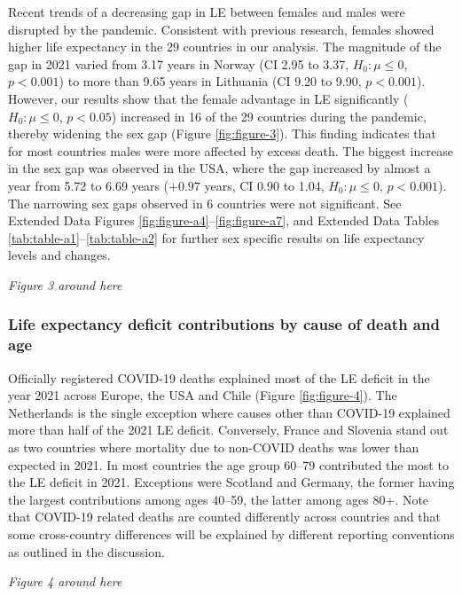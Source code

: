 \documentclass[12pt]{article}
\begin{document}
Recent trends of a decreasing gap in LE between females and males\cite{Zarulli2021} were disrupted by the pandemic. Consistent with previous research, females showed higher life expectancy in the 29 countries in our analysis.
The magnitude of the gap in 2021 varied from 3.17 years in Norway (CI 2.95 to 3.37, $H_0: \mu \leq 0$, $p < 0.001$) to more than 9.65 years in Lithuania (CI 9.20 to 9.90, $p < 0.001$).
However, our results show that the female advantage in LE significantly ($H_0: \mu \leq 0$, $p<0.05$) increased in 16 of the 29 countries during the pandemic, thereby widening the sex gap (Figure \ref{fig:figure-3}).
This finding indicates that for most countries males were more affected by excess death.
The biggest increase in the sex gap was observed in the USA, where the gap increased by almost a year from 5.72 to 6.69 years ($+0.97$ years, CI 0.90 to 1.04, $H_0: \mu \leq 0$, $p < 0.001$).
The narrowing sex gaps observed in 6 countries were not significant. See Extended Data Figures \ref{fig:figure-a4}--\ref{fig:figure-a7}, and Extended Data Tables \ref{tab:table-a1}--\ref{tab:table-a2} for further sex specific results on life expectancy levels and changes.

\par\medskip
\emph{Figure 3 around here}
\par\medskip

\subsubsection*{Life expectancy deficit contributions by cause of death and age}

Officially registered COVID-19 deaths explained most of the LE deficit in the year 2021 across Europe, the USA and Chile (Figure \ref{fig:figure-4}). The Netherlands is the single exception where causes other than COVID-19 explained more than half of the 2021 LE deficit. Conversely, France and Slovenia stand out as two countries where mortality due to non-COVID deaths was lower than expected in 2021. In most countries the age group 60--79 contributed the most to the LE deficit in 2021. Exceptions were Scotland and Germany, the former having the largest contributions among ages 40--59, the latter among ages 80+. Note that COVID-19 related deaths are counted differently across countries and that some cross-country differences will be explained by different reporting conventions as outlined in the discussion.

\par\medskip
\emph{Figure 4 around here}
\par\medskip
\end{document}
